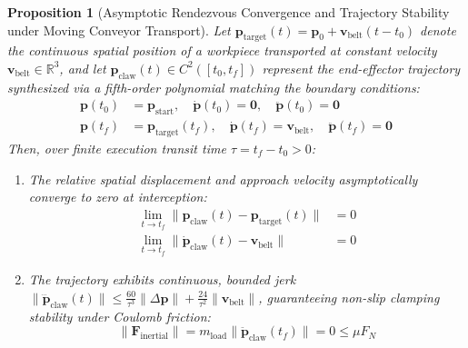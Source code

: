 \documentclass[journal]{IEEEtran}
\newtheorem{proposition}{Proposition}
\begin{document}
\begin{proposition}[Asymptotic Rendezvous Convergence and Trajectory Stability under Moving Conveyor Transport]
\label{prop_rendezvous}
Let $\mathbf{p}_{\text{target}}(t) = \mathbf{p}_0 + \mathbf{v}_{\text{belt}} (t - t_0)$ denote the continuous spatial position of a workpiece transported at constant velocity $\mathbf{v}_{\text{belt}} \in \mathbb{R}^3$, and let $\mathbf{p}_{\text{claw}}(t) \in C^2([t_0, t_f])$ represent the end-effector trajectory synthesized via a fifth-order polynomial matching the boundary conditions:
\begin{align}
\mathbf{p}(t_0) &= \mathbf{p}_{\text{start}}, \quad \dot{\mathbf{p}}(t_0) = \mathbf{0}, \quad \ddot{\mathbf{p}}(t_0) = \mathbf{0} \\
\mathbf{p}(t_f) &= \mathbf{p}_{\text{target}}(t_f), \quad \dot{\mathbf{p}}(t_f) = \mathbf{v}_{\text{belt}}, \quad \ddot{\mathbf{p}}(t_f) = \mathbf{0}
\end{align}
Then, over finite execution transit time $\tau = t_f - t_0 > 0$:
\begin{enumerate}
    \item The relative spatial displacement and approach velocity asymptotically converge to zero at interception:
    \begin{align}
    \lim_{t \to t_f} \|\mathbf{p}_{\text{claw}}(t) - \mathbf{p}_{\text{target}}(t)\| &= 0 \\
    \lim_{t \to t_f} \|\dot{\mathbf{p}}_{\text{claw}}(t) - \mathbf{v}_{\text{belt}}\| &= 0
    \end{align}
    \item The trajectory exhibits continuous, bounded jerk $\|\dddot{\mathbf{p}}_{\text{claw}}(t)\| \le \frac{60}{\tau^3}\|\Delta\mathbf{p}\| + \frac{24}{\tau^2}\|\mathbf{v}_{\text{belt}}\|$, guaranteeing non-slip clamping stability under Coulomb friction:
    \begin{equation}
    \| \mathbf{F}_{\text{inertial}} \| = m_{\text{load}} \| \ddot{\mathbf{p}}_{\text{claw}}(t_f) \| = 0 \le \mu F_N
    \end{equation}
\end{enumerate}
\end{proposition}
\end{document}
